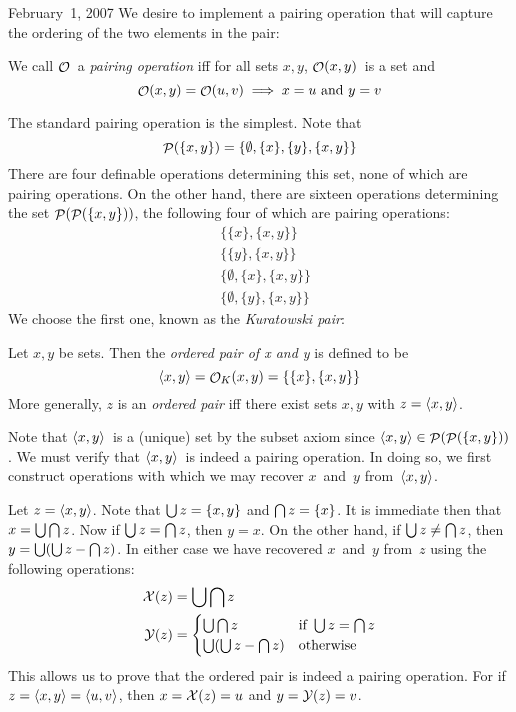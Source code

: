 \begin{lecture}{February~1, 2007}
We desire to implement a pairing operation that will capture the ordering of the two elements in the pair:
\begin{defn}
We call \(\mathop{\mathcal{O}}\nolimits\)~a \emph{pairing operation} iff for all sets \(x,y\), \(\mathop{\mathcal{O}}\nolimits(x,y)\)~is a set and
\[\mathop{\mathcal{O}}\nolimits(x,y)=\mathop{\mathcal{O}}\nolimits(u,v)\implies x=u\text{ and }y=v\]
\end{defn}
\noindent The standard pairing operation is the simplest. Note that
\[\mathop{\mathcal{P}}(\{x,y\})=\{\emptyset,\{x\},\{y\},\{x,y\}\}\]
There are four definable operations determining this set, none of which are pairing operations. On the other hand, there are sixteen operations determining the set \(\mathop{\mathcal{P}}(\mathop{\mathcal{P}}(\{x,y\}))\), the following four of which are pairing operations:
\begin{align*}
&\{\{x\},\{x,y\}\}\\
&\{\{y\},\{x,y\}\}\\
&\{\emptyset,\{x\},\{x,y\}\}\\
&\{\emptyset,\{y\},\{x,y\}\}
\end{align*}
We choose the first one, known as the \emph{Kuratowski pair}:
\begin{defn}
Let \(x,y\) be sets. Then the \emph{ordered pair of x and y} is defined to be
\[\langle{x},{y}\rangle=\mathop{\mathcal{O}}\nolimits_K(x,y)=\{\{x\},\{x,y\}\}\]
More generally, \(z\) is an \emph{ordered pair} iff there exist sets \(x,y\) with \(z=\langle{x},{y}\rangle\).
\end{defn}
\noindent Note that \(\langle{x},{y}\rangle\)~is a (unique) set by the subset axiom since \(\langle{x},{y}\rangle\in\mathop{\mathcal{P}}(\mathop{\mathcal{P}}(\{x,y\}))\). We must verify that \(\langle{x},{y}\rangle\)~is indeed a pairing operation. In doing so, we first construct operations with which we may recover \(x\)~and~\(y\) from~\(\langle{x},{y}\rangle\).

Let \(z=\langle{x},{y}\rangle\). Note that \(\bigcup z=\{x,y\}\) and \(\bigcap z=\{x\}\). It is immediate then that \(x=\bigcup\bigcap z\). Now if \(\bigcup z=\bigcap z\), then \(y=x\). On the other hand, if \(\bigcup z\ne\bigcap z\), then \(y=\bigcup(\bigcup z-\bigcap z)\). In either case we have recovered \(x\)~and~\(y\) from~\(z\) using the following operations:
\begin{align*}
\mathcal{X}(z)&=\bigcup\bigcap z\\
\mathcal{Y}(z)&=
\begin{cases}
\bigcup\bigcap z&\text{if }\bigcup z=\bigcap z\\
\bigcup(\bigcup z-\bigcap z)&\text{otherwise}
\end{cases}
\end{align*}
This allows us to prove that the ordered pair is indeed a pairing operation. For if \(z=\langle{x},{y}\rangle=\langle{u},{v}\rangle\), then \(x=\mathcal{X}(z)=u\) and \(y=\mathcal{Y}(z)=v\).


\end{lecture}
